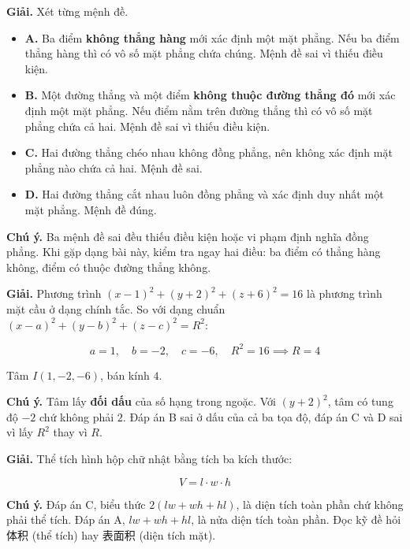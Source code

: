 \documentclass[11pt, a4paper]{article}
\begin{document}
\begin{dapan}[16 — Đáp án D]
\textbf{Giải.} Xét từng mệnh đề.

\begin{itemize}[leftmargin=1.4em, itemsep=2pt]
\item \textbf{A.} Ba điểm \textbf{không thẳng hàng} mới xác định một mặt phẳng. Nếu ba điểm thẳng hàng thì có vô số mặt phẳng chứa chúng. Mệnh đề sai vì thiếu điều kiện.
\item \textbf{B.} Một đường thẳng và một điểm \textbf{không thuộc đường thẳng đó} mới xác định một mặt phẳng. Nếu điểm nằm trên đường thẳng thì có vô số mặt phẳng chứa cả hai. Mệnh đề sai vì thiếu điều kiện.
\item \textbf{C.} Hai đường thẳng chéo nhau không đồng phẳng, nên không xác định mặt phẳng nào chứa cả hai. Mệnh đề sai.
\item \textbf{D.} Hai đường thẳng cắt nhau luôn đồng phẳng và xác định duy nhất một mặt phẳng. Mệnh đề đúng.
\end{itemize}


\textbf{Chú ý.} Ba mệnh đề sai đều thiếu điều kiện hoặc vi phạm định nghĩa đồng phẳng. Khi gặp dạng bài này, kiểm tra ngay hai điều: ba điểm có thẳng hàng không, điểm có thuộc đường thẳng không.
\end{dapan}

\begin{dapan}[17 — Đáp án A]
\textbf{Giải.} Phương trình $(x-1)^2 + (y+2)^2 + (z+6)^2 = 16$ là phương trình mặt cầu ở dạng chính tắc. So với dạng chuẩn $(x-a)^2 + (y-b)^2 + (z-c)^2 = R^2$:

$$a = 1, \quad b = -2, \quad c = -6, \quad R^2 = 16 \implies R = 4$$

Tâm $I(1, -2, -6)$, bán kính $4$.

\textbf{Chú ý.} Tâm lấy \textbf{đối dấu} của số hạng trong ngoặc. Với $(y+2)^2$, tâm có tung độ $-2$ chứ không phải $2$. Đáp án B sai ở dấu của cả ba tọa độ, đáp án C và D sai vì lấy $R^2$ thay vì $R$.
\end{dapan}

\begin{dapan}[18 — Đáp án B]
\textbf{Giải.} Thể tích hình hộp chữ nhật bằng tích ba kích thước:

$$V = l \cdot w \cdot h$$

\textbf{Chú ý.} Đáp án C, biểu thức $2(lw + wh + hl)$, là diện tích toàn phần chứ không phải thể tích. Đáp án A, $lw + wh + hl$, là nửa diện tích toàn phần. Đọc kỹ đề hỏi 体积 (thể tích) hay 表面积 (diện tích mặt).
\end{dapan}
\end{document}

